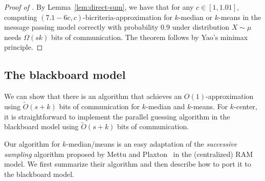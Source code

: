 \begin{proof}[Proof of  ]
By Lemma~\ref{lem:direct-sum}, we have that for any $c \in [1, 1.01]$, computing $(7.1 - 6c, c)$-bicriteria-approximation for $k$-median or $k$-means in the message passing model correctly with probability $0.9$ under distribution $X \sim \mu$ needs $\Omega(sk)$ bits of communication.  The theorem follows by Yao's minimax principle.
\end{proof}




\subsection{The blackboard model}
\label{sec:geo-bb}
We can show that there is an algorithm that achieves an $O(1)$-approximation using $\tilde{O}(s + k)$ bits of communication for $k$-median and $k$-means.  %
For $k$-center, it is straightforward to implement the parallel guessing algorithm in the blackboard model using $\tilde{O}(s + k)$ bits of communication.




Our algorithm for $k$-median/means is an easy adaptation of the {\em successive sampling} algorithm proposed by Mettu and Plaxton~\cite{MP04} in the (centralized) RAM model.  We first summarize their algorithm and then describe how to port it to the blackboard model.

